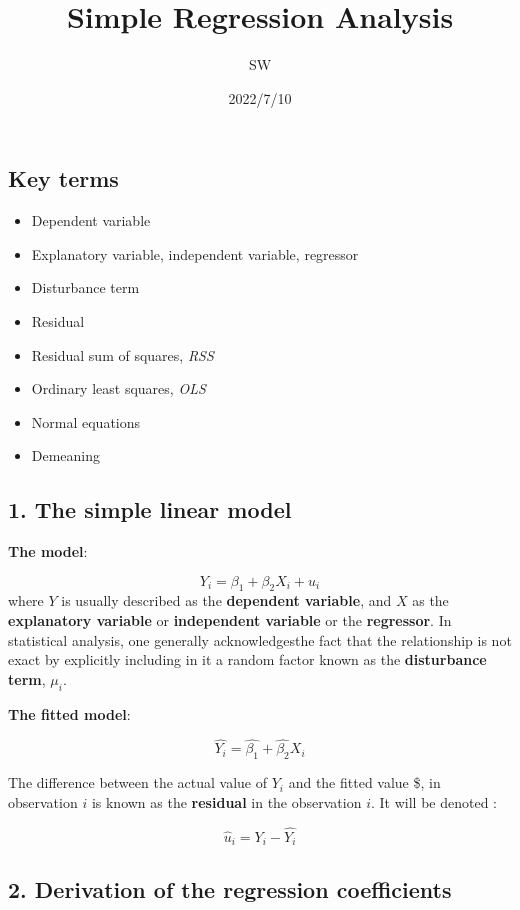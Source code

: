 \documentclass[
]{article}
\title{Simple Regression Analysis}
\author{SW}
\date{2022/7/10}
\providecommand{\tightlist}{%
  \setlength{\itemsep}{0pt}\setlength{\parskip}{0pt}}
\begin{document}
\maketitle

\hypertarget{key-terms}{%
\subsection{Key terms}\label{key-terms}}

\begin{itemize}
\tightlist
\item
  Dependent variable
\item
  Explanatory variable, independent variable, regressor
\item
  Disturbance term
\item
  Residual
\item
  Residual sum of squares, \emph{RSS}
\item
  Ordinary least squares, \emph{OLS}
\item
  Normal equations
\item
  Demeaning
\end{itemize}

\hypertarget{the-simple-linear-model}{%
\subsection{1. The simple linear model}\label{the-simple-linear-model}}

\textbf{The model}:

\[Y_{i}=\beta_{1}+\beta_{2}X_{i}+u_{i}\] where \(Y\) is usually
described as the \textbf{dependent variable}, and \(X\) as the
\textbf{explanatory variable} or \textbf{independent variable} or the
\textbf{regressor}. In statistical analysis, one generally
acknowledgesthe fact that the relationship is not exact by explicitly
including in it a random factor known as the \textbf{disturbance term},
\(\mu_{i}\).

\textbf{The fitted model}:

\[\hat{Y_{i}}=\hat{\beta_{1}}+\hat{\beta_{2}}X_{i}\]

The difference between the actual value of \(Y_{i}\) and the fitted
value \$, in observation \(i\) is known as the
\textbf{residual} in the observation \(i\). It will be denoted
:

\[\hat{u}_{i}=Y_{i}-\hat{Y_{i}}\]

\hypertarget{derivation-of-the-regression-coefficients}{%
\subsection{2. Derivation of the regression
coefficients}\label{derivation-of-the-regression-coefficients}}
\end{document}
